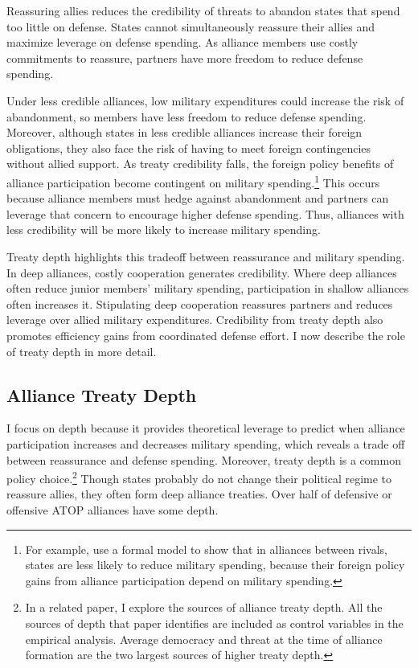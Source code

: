\documentclass[12pt]{article}
\begin{document}
Reassuring allies reduces the credibility of threats to abandon states that spend too little on defense. 
States cannot simultaneously reassure their allies and maximize leverage on defense spending. 
As alliance members use costly commitments to reassure, partners have more freedom to reduce defense spending. 


Under less credible alliances, low military expenditures could increase the risk of abandonment, so members have less freedom to reduce defense spending. 
Moreover, although states in less credible alliances increase their foreign obligations, they also face the risk of having to meet foreign contingencies without allied support. 
As treaty credibility falls, the foreign policy benefits of alliance participation become contingent on military spending.\footnote{For example, \citep{NiouZeigler2019} use a formal model to show that in alliances between rivals, states are less likely to reduce military spending, because their foreign policy gains from alliance participation depend on military spending.} 
This occurs because alliance members must hedge against abandonment and partners can leverage that concern to encourage higher defense spending.
Thus, alliances with less credibility will be more likely to increase military spending. 


Treaty depth highlights this tradeoff between reassurance and military spending.
In deep alliances, costly cooperation generates credibility. 
Where deep alliances often reduce junior members' military spending, participation in shallow alliances often increases it. 
Stipulating deep cooperation reassures partners and reduces leverage over allied military expenditures. 
Credibility from treaty depth also promotes efficiency gains from coordinated defense effort. 
I now describe the role of treaty depth in more detail. 



\subsection{Alliance Treaty Depth} 


I focus on depth because it provides theoretical leverage to predict when alliance participation increases and decreases military spending, which reveals a trade off between reassurance and defense spending.  
Moreover, treaty depth is a common policy choice.\footnote{In a related paper, I explore the sources of alliance treaty depth. All the sources of depth that paper identifies are included as control variables in the empirical analysis. Average democracy and threat at the time of alliance formation are the two largest sources of higher treaty depth.} 
Though states probably do not change their political regime to reassure allies, they often form deep alliance treaties. 
Over half of defensive or offensive ATOP alliances have some depth. 
\end{document}
